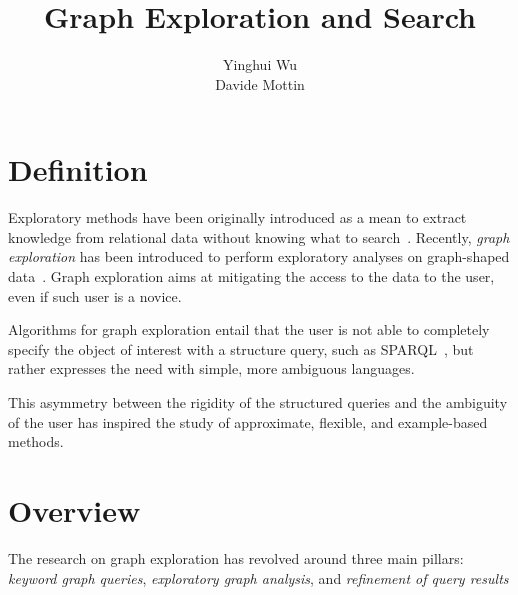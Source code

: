 \documentclass[graybox, natbib, nosecnum, twocolumn]{svmult}
\begin{document}
\title*{Graph Exploration and Search}
\author{Yinghui Wu\\Davide Mottin}
%
%
\maketitle


\section{Definition}

Exploratory methods have been originally introduced as a mean to extract knowledge from relational data without knowing what to search~\cite{idreos2015overview}. 
Recently, \emph{graph exploration} has been introduced to perform exploratory analyses on graph-shaped data~\cite{mottin2017graph}. 
Graph exploration aims at mitigating the access to the data to the user, even if such user is a novice. 

Algorithms for graph exploration entail that the user is not able to completely specify the object of interest with  a structure query, such as SPARQL~\cite{prud2006sparql}, but rather expresses the need with simple, more ambiguous languages.

This asymmetry between the rigidity of the structured queries and the ambiguity of the user has inspired the study of approximate, flexible, and example-based methods. 


\section{Overview}

The research on graph exploration has revolved around three main pillars: \emph{keyword graph queries}, \emph{exploratory graph analysis}, and \emph{refinement of query results} 
\end{document}

